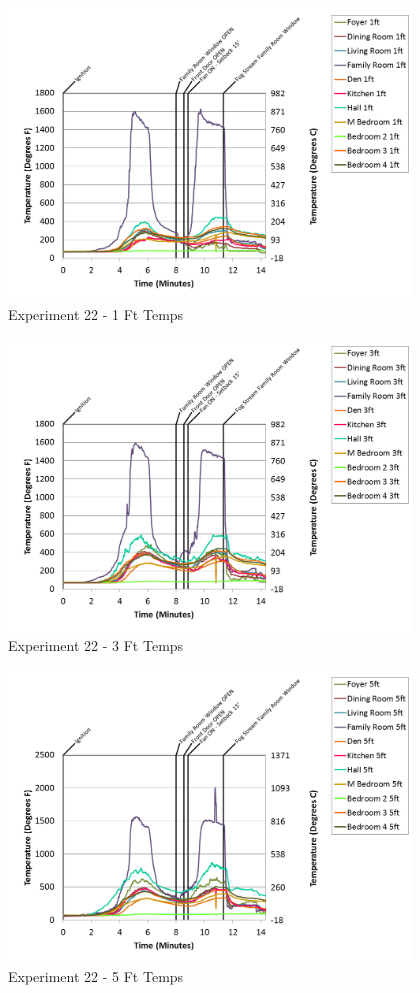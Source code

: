 \documentclass{article}
\begin{document}
\begin{appendices}
\begin{figure}[h!]
	\centering
	\includegraphics[height=3.05in]{0_Images/Results_Charts/Exp_22_Charts/1FtTemps.png}
	\caption{Experiment 22 - 1 Ft Temps}
\end{figure}


\begin{figure}[h!]
	\centering
	\includegraphics[height=3.05in]{0_Images/Results_Charts/Exp_22_Charts/3FtTemps.png}
	\caption{Experiment 22 - 3 Ft Temps}
\end{figure}

\clearpage

\begin{figure}[h!]
	\centering
	\includegraphics[height=3.05in]{0_Images/Results_Charts/Exp_22_Charts/5FtTemps.png}
	\caption{Experiment 22 - 5 Ft Temps}
\end{figure}



\end{appendices}
\end{document}
